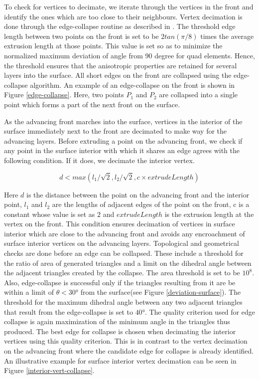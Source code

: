 \documentclass[conf]{new-aiaa}
\begin{document}
To check for vertices to decimate, we iterate through the vertices in the front and identify the ones which are too close to their neighbours. Vertex decimation is done through the edge-collapse routine as described in \cite{hoppe1994mesh}. The threshold edge length between two points on the front is set to be $2 tan(\pi/8)$ times the average extrusion length at those points. This value is set so as to minimize the normalized maximum deviation of angle from $90$ degree for quad elements. Hence, the threshold ensures that the anisotropic properties are retained for several layers into the surface. All short edges on the front are collapsed using the edge-collapse algorithm. An example of an edge-collapse on the front is shown in Figure \ref{edge-collapse}. Here, two points $P_1$ and $P_2$ are collapsed into a single point which forms a part of the next front on the surface.

As the advancing front marches into the surface, vertices in the interior of the surface immediately next to the front are decimated to make way for the advancing layers. Before extruding a point on the advancing front, we check if any point in the surface interior with which it shares an edge agrees with the following condition. If it does, we decimate the interior vertex.

\begin{equation}
    d < max(l_{1}/\sqrt{2}, l_{2}/\sqrt{2}, c\times extrudeLength)
    \label{collapse-eq}
\end{equation}

Here $d$ is the distance between the point on the advancing front and the interior point, $l_1$ and $l_2$ are the lengths of adjacent edges of the point on the front, c is a constant whose value is set as $2$ and $extrudeLength$ is the extrusion length at the vertex on the front. This condition ensures decimation of vertices in surface interior which are close to the advancing front and avoids any encroachment of surface interior vertices on the advancing layers. Topological and geometrical checks are done before an edge can be collapsed. These include a threshold for the ratio of area of generated triangles and a limit on the dihedral angle between the adjacent triangles created by the collapse. The area threshold is set to be $10^8$. Also, edge-collapse is successful only if the triangles resulting from it are be within a limit of $\theta < \ang{30}$ from the surface(see Figure \ref{deviation-surface}). The threshold for the maximum dihedral angle between any two adjacent triangles that result from the edge-collapse is set to $\ang{40}$. The quality criterion used for edge collapse is again maximization of the minimum angle in the triangles thus produced. The best edge for collapse is chosen when decimating the interior vertices using this quality criterion. This is in contrast to the vertex decimation on the advancing front where the candidate edge for collapse is already identified. An illustrative example for surface interior vertex decimation can be seen in Figure \ref{interior-vert-collapse}.
\end{document}
